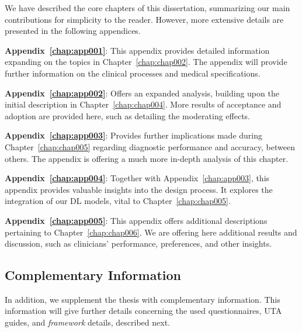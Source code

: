We have described the core chapters of this dissertation, summarizing our main contributions for simplicity to the reader.
However, more extensive details are presented in the following appendices.

\vspace{2.00mm}

\noindent
{\bf Appendix~\ref{chap:app001}}:
This appendix provides detailed information expanding on the topics in Chapter~\ref{chap:chap002}.
The appendix will provide further information on the clinical processes and medical specifications.

\vspace{2.00mm}

\noindent
{\bf Appendix~\ref{chap:app002}}:
Offers an expanded analysis, building upon the initial description in Chapter~\ref{chap:chap004}.
More results of acceptance and adoption are provided here, such as detailing the moderating effects.

\vspace{2.00mm}

\noindent
{\bf Appendix~\ref{chap:app003}}:
Provides further implications made during Chapter~\ref{chap:chap005} regarding diagnostic performance and accuracy, between others.
The appendix is offering a much more in-depth analysis of this chapter.

\vspace{2.00mm}

\noindent
{\bf Appendix~\ref{chap:app004}}:
Together with Appendix~\ref{chap:app003}, this appendix provides valuable insights into the design process.
It explores the integration of our \ac{DL} models, vital to Chapter~\ref{chap:chap005}.

\vspace{2.00mm}

\noindent
{\bf Appendix~\ref{chap:app005}}:
This appendix offers additional descriptions pertaining to Chapter~\ref{chap:chap006}.
We are offering here additional results and discussion, such as clinicians' performance, preferences, and other insights.

\subsection{Complementary Information}
\label{sec:chap001004003}

In addition, we supplement the thesis with complementary information.
This information will give further details concerning the used questionnaires, \ac{UTA} guides, and {\it framework} details, described next.

